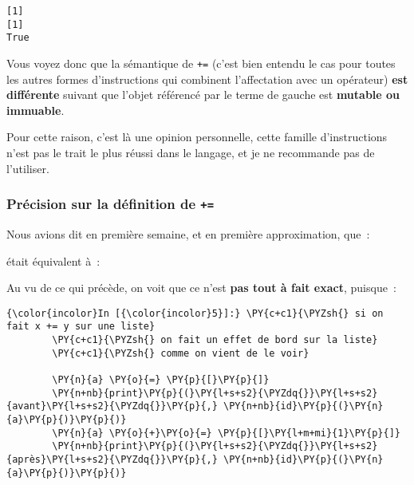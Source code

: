     \begin{Verbatim}[commandchars=\\\{\},frame=single,framerule=0.3mm,rulecolor=\color{cellframecolor}]
[1]
[1]
True
\end{Verbatim}

    Vous voyez donc que la sémantique de \texttt{+=} (c'est bien entendu le
cas pour toutes les autres formes d'instructions qui combinent
l'affectation avec un opérateur) \textbf{est différente} suivant que
l'objet référencé par le terme de gauche est \textbf{mutable ou
immuable}.

    Pour cette raison, c'est là une opinion personnelle, cette famille
d'instructions n'est pas le trait le plus réussi dans le langage, et je
ne recommande pas de l'utiliser.

    \hypertarget{pruxe9cision-sur-la-duxe9finition-de}{%
\subsubsection{\texorpdfstring{Précision sur la définition de
\texttt{+=}}{Précision sur la définition de +=}}\label{pruxe9cision-sur-la-duxe9finition-de}}

    Nous avions dit en première semaine, et en première approximation, que~:

\begin{Shaded}
\begin{Highlighting}[frame=lines,framerule=0.6mm,rulecolor=\color{asisframecolor}]
\OperatorTok{+=}
\end{Highlighting}
\end{Shaded}

était équivalent à~:

\begin{Shaded}
\begin{Highlighting}[frame=lines,framerule=0.6mm,rulecolor=\color{asisframecolor}]
\OperatorTok{=}\OperatorTok{+}
\end{Highlighting}
\end{Shaded}

    Au vu de ce qui précède, on voit que ce n'est \textbf{pas tout à fait
exact}, puisque~:

    \begin{Verbatim}[commandchars=\\\{\},frame=single,framerule=0.3mm,rulecolor=\color{cellframecolor}]
{\color{incolor}In [{\color{incolor}5}]:} \PY{c+c1}{\PYZsh{} si on fait x += y sur une liste}
        \PY{c+c1}{\PYZsh{} on fait un effet de bord sur la liste}
        \PY{c+c1}{\PYZsh{} comme on vient de le voir}
        
        \PY{n}{a} \PY{o}{=} \PY{p}{[}\PY{p}{]}
        \PY{n+nb}{print}\PY{p}{(}\PY{l+s+s2}{\PYZdq{}}\PY{l+s+s2}{avant}\PY{l+s+s2}{\PYZdq{}}\PY{p}{,} \PY{n+nb}{id}\PY{p}{(}\PY{n}{a}\PY{p}{)}\PY{p}{)}
        \PY{n}{a} \PY{o}{+}\PY{o}{=} \PY{p}{[}\PY{l+m+mi}{1}\PY{p}{]}
        \PY{n+nb}{print}\PY{p}{(}\PY{l+s+s2}{\PYZdq{}}\PY{l+s+s2}{après}\PY{l+s+s2}{\PYZdq{}}\PY{p}{,} \PY{n+nb}{id}\PY{p}{(}\PY{n}{a}\PY{p}{)}\PY{p}{)}
\end{Verbatim}


